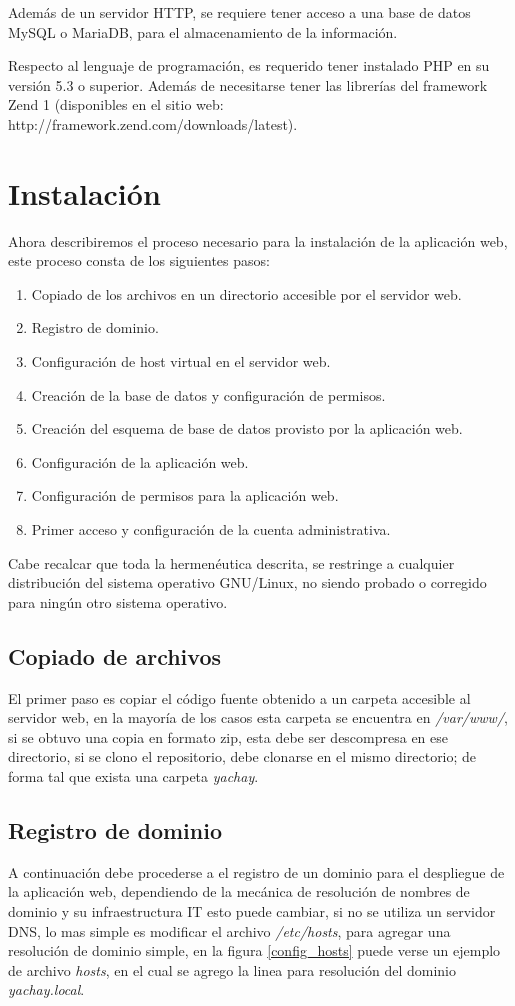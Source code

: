 Además de un servidor HTTP, se requiere tener acceso a una base de datos MySQL o
MariaDB, para el almacenamiento de la información.

Respecto al lenguaje de programación, es requerido tener instalado PHP en su
versión 5.3 o superior. Además de necesitarse tener las librerías del framework
Zend 1 (disponibles en el sitio web:
http://framework.zend.com/downloads/latest).

\section{Instalación}
Ahora describiremos el proceso necesario para la instalación de la aplicación
web, este proceso consta de los siguientes pasos:

\begin{enumerate}
\item Copiado de los archivos en un directorio accesible por el servidor web.
\item Registro de dominio.
\item Configuración de host virtual en el servidor web.
\item Creación de la base de datos y configuración de permisos.
\item Creación del esquema de base de datos provisto por la aplicación web.
\item Configuración de la aplicación web.
\item Configuración de permisos para la aplicación web.
\item Primer acceso y configuración de la cuenta administrativa.
\end{enumerate}

Cabe recalcar que toda la hermenéutica descrita, se restringe a cualquier
distribución del sistema operativo GNU/Linux, no siendo probado o corregido
para ningún otro sistema operativo.

\subsection{Copiado de archivos}
El primer paso es copiar el código fuente obtenido a un carpeta accesible al
servidor web, en la mayoría de los casos esta carpeta se encuentra en
\emph{/var/www/}, si se obtuvo una copia en formato zip, esta debe ser
descompresa en ese directorio, si se clono el repositorio, debe clonarse en el
mismo directorio; de forma tal que exista una carpeta \emph{yachay}.

\subsection{Registro de dominio}
A continuación debe procederse a el registro de un dominio para el despliegue de
la aplicación web, dependiendo de la mecánica de resolución de nombres de
dominio y su infraestructura IT esto puede cambiar, si no se utiliza un servidor
DNS, lo mas simple es modificar el archivo \emph{/etc/hosts}, para agregar una
resolución de dominio simple, en la figura \ref{config_hosts} puede verse un
ejemplo de archivo \emph{hosts}, en el cual se agrego la linea para resolución
del dominio \emph{yachay.local}.

